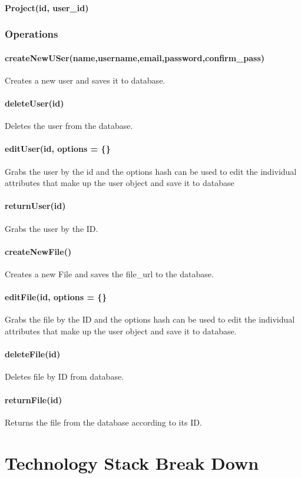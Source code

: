 \documentclass{report}
\begin{document}
\subsubsection{Project(id, user\_id)}
\subsection{Operations}
\subsubsection{createNewUSer(name,username,email,password,confirm\_pass)}
Creates a new user and saves it to database.
\subsubsection{deleteUser(id)}
Deletes the user from the database.
\subsubsection{editUser(id, options = \{\}}
Grabs the user by the id and the options hash can be used to edit the individual attributes that make up the user object and save it to database
\subsubsection{returnUser(id)}
Grabs the user by the ID.
\subsubsection{createNewFile()}
Creates a new File and saves the file\_url to the database.
\subsubsection{editFile(id, options = \{\}}
Grabs the file by the ID and the options hash can be used to edit the individual attributes that make up the user object and save it to database.
\subsubsection{deleteFile(id)}
Deletes file by ID from database.
\subsubsection{returnFile(id)}
Returns the file from the database according to its ID.


\chapter{Technology Stack Break Down}
\end{document}
